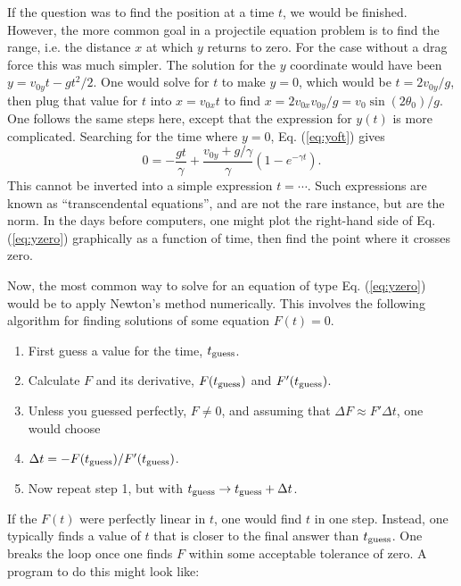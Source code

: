 If the question was to find the position at a time $t$, we would be finished. However, the more common goal in a projectile equation problem is to find the range, i.e. the distance $x$ at which $y$ returns to zero. For the case without a drag force this was much simpler. The solution for the $y$ coordinate would have been $y=v_{0y}t-gt^2/2$. One would solve for $t$ to make $y=0$, which would be $t=2v_{0y}/g$, then plug that value for $t$ into $x=v_{0x}t$ to find $x=2v_{0x}v_{0y}/g=v_0\sin(2\theta_0)/g$. One follows the same steps here, except that the expression for $y(t)$ is more complicated. Searching for the time where $y=0$, Eq. (\ref{eq:yoft}) gives
\begin{equation}
\label{eq:yzero}
0=-\frac{gt}{\gamma}+\frac{v_{0y}+g/\gamma}{\gamma}\left(1-e^{-\gamma t}\right).
\end{equation}
This cannot be inverted into a simple expression $t=\cdots$. Such expressions are known as ``transcendental equations'', and are not the rare instance, but are the norm. In the days before computers, one might plot the right-hand side of Eq. (\ref{eq:yzero}) graphically as a function of time, then find the point where it crosses zero. 

Now, the most common way to solve for an equation of type Eq. (\ref{eq:yzero}) would be to apply Newton's method numerically. This involves the following algorithm for finding solutions of some equation $F(t)=0$.
\begin{enumerate}
\item First guess a value for the time, $t_{\rm guess}$.
\item Calculate $F$ and its derivative, $F(t_{\rm guess})$ and $F'(t_{\rm guess})$. 
\item Unless you guessed perfectly, $F\ne 0$, and assuming that $\Delta F\approx F'\Delta t$, one would choose 
\item $\Delta t=-F(t_{\rm guess})/F'(t_{\rm guess})$.
\item Now repeat step 1, but with $t_{\rm guess}\rightarrow t_{\rm guess}+\Delta t$.
\end{enumerate}
If the $F(t)$ were perfectly linear in $t$, one would find $t$ in one step. Instead, one typically finds a value of $t$ that is closer to the final answer than $t_{\rm guess}$. One breaks the loop once one finds $F$ within some acceptable tolerance of zero. A program to do this might look like:

